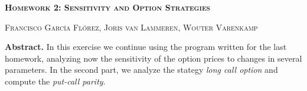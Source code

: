 \documentclass[8 pt]{article}
\begin{document}
\begin{minipage}{\textwidth}
    \centering
    \Large \textbf{\textsc{Homework 2: Sensitivity and Option Strategies}}
    \vspace{0.5cm}

    \small \textsc{Francisco García Flórez, Joris van Lammeren, Wouter Varenkamp}
    \vspace{0.5cm}

    \begin{minipage}{0.6\textwidth}
      \textbf{Abstract.} In this exercise we continue using the program written for the last homework, analyzing now the sensitivity of the option prices to changes in several parameters. In the second part, we analyze the stategy \emph{long call option} and compute the \emph{put-call parity}.
    \end{minipage}
\end{minipage}

\vspace{0.5cm}
\end{document}
